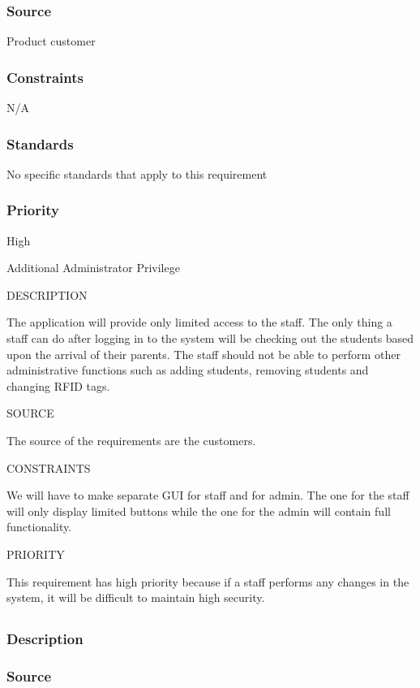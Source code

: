\subsubsection{Source}
Product customer
\subsubsection{Constraints}
N/A
\subsubsection{Standards}
No specific standards that apply to this requirement
\subsubsection{Priority}
High

Additional Administrator Privilege

DESCRIPTION

The application will provide only limited access to the staff. The only thing a staff can do after logging in to the system will be checking out the students based upon the arrival of their parents. The staff should not be able to perform other administrative functions such as adding students, removing students and changing RFID tags.

SOURCE

The source of the requirements are the customers.

CONSTRAINTS

We will have to make separate GUI for staff and for admin. The one for the staff will only display limited buttons while the one for the admin will contain full functionality.


PRIORITY

This requirement has high priority because if a staff performs any changes in the system, it will be difficult to maintain high security.






\subsection{}
\subsubsection{Description}

\subsubsection{Source}

